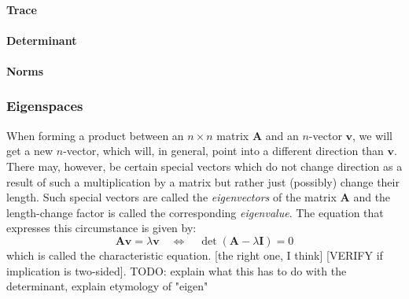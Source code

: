 
\paragraph{Trace}



\paragraph{Determinant}

\paragraph{Norms}


\subsubsection{Eigenspaces}
When forming a product between an $n \times n$ matrix $\mathbf{A}$ and an $n$-vector $\mathbf{v}$, we will get a new $n$-vector, which will, in general, point into a different direction than  $\mathbf{v}$. There may, however, be certain special vectors which do not change direction as a result of such a multiplication by a matrix but rather just (possibly) change their length. Such special vectors are called the \emph{eigenvectors} of the matrix $\mathbf{A}$ and the length-change factor is called the corresponding \emph{eigenvalue}. The equation that expresses this circumstance is given by:
\begin{equation}
 \mathbf{A v} = \lambda \mathbf{v}  
 \quad \Leftrightarrow \quad
 \det ( \mathbf{A} - \lambda \mathbf{I} ) = 0
\end{equation}
which is called the characteristic equation. [the right one, I think]
[VERIFY if implication is two-sided]. TODO: explain what this has to do with the determinant, explain etymology of "eigen"


